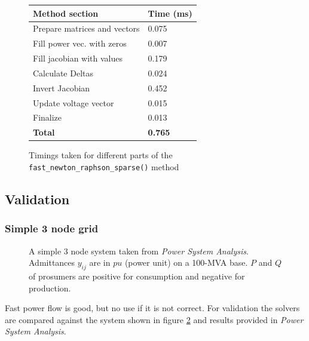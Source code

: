 \begin{figure}[H]
    \begin{center}
        \begin{tabular}{ll}
            \textbf{Method section} & \textbf{Time (ms)}\\
            \hline
            Prepare matrices and vectors & 0.075\\
            Fill power vec. with zeros &  0.007\\
            Fill jacobian with values & 0.179\\
            Calculate Deltas &      0.024\\
            Invert Jacobian &      0.452\\
            Update voltage vector & 0.015\\
            Finalize & 0.013\\
            \hline
            \textbf{Total} & \textbf{0.765}
        \end{tabular}
    \end{center}
\caption{Timings taken for different parts of the \texttt{fast\_newton\_raphson\_sparse()} method}
\label{fig:pf:perf:sparse}
\end{figure}

\subsection{Validation}

\subsubsection{Simple 3 node grid}

\begin{figure}[H]
    \centering
    
    \caption{
        A simple 3 node system taken from \textit{Power System Analysis}\autocite{power_system_analysis}.
        Admittances $y_{ij}$ are in $pu$ (power unit) on a 100-MVA base.
        $P$ and $Q$ of prosumers are positive for consumption and negative for production.
    }
    \label{fig:pf:3_node_system}
\end{figure}


Fast power flow is good, but no use if it is not correct. For validation
the solvers are compared against the system shown in figure \ref{fig:pf:3_node_system} and results
provided in \textit{Power System Analysis}\autocite{power_system_analysis}.

